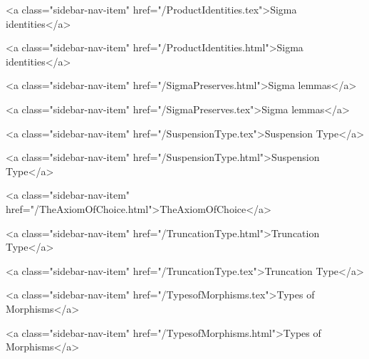       
        
          <a class="sidebar-nav-item" href="/ProductIdentities.tex">Sigma identities</a>
        
      
    
      
        
          <a class="sidebar-nav-item" href="/ProductIdentities.html">Sigma identities</a>
        
      
    
      
        
          <a class="sidebar-nav-item" href="/SigmaPreserves.html">Sigma lemmas</a>
        
      
    
      
        
          <a class="sidebar-nav-item" href="/SigmaPreserves.tex">Sigma lemmas</a>
        
      
    
      
        
          <a class="sidebar-nav-item" href="/SuspensionType.tex">Suspension Type</a>
        
      
    
      
        
          <a class="sidebar-nav-item" href="/SuspensionType.html">Suspension Type</a>
        
      
    
      
        
          <a class="sidebar-nav-item" href="/TheAxiomOfChoice.html">TheAxiomOfChoice</a>
        
      
    
      
        
          <a class="sidebar-nav-item" href="/TruncationType.html">Truncation Type</a>
        
      
    
      
        
          <a class="sidebar-nav-item" href="/TruncationType.tex">Truncation Type</a>
        
      
    
      
        
          <a class="sidebar-nav-item" href="/TypesofMorphisms.tex">Types of Morphisms</a>
        
      
    
      
        
          <a class="sidebar-nav-item" href="/TypesofMorphisms.html">Types of Morphisms</a>
        
